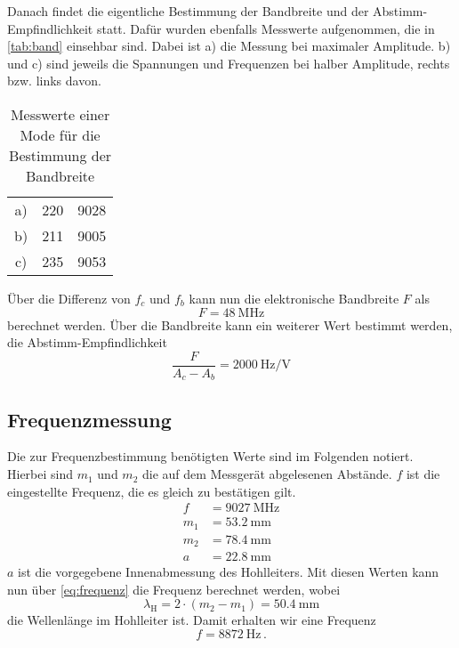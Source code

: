 Danach findet die eigentliche Bestimmung der Bandbreite und der Abstimm-Empfindlichkeit statt.
Dafür wurden ebenfalls Messwerte aufgenommen, die in \autoref{tab:band} einsehbar sind.
Dabei ist a) die Messung bei maximaler Amplitude.
b) und c) sind jeweils die Spannungen und Frequenzen bei halber Amplitude, rechts bzw. links davon.

\begin{table}
    \centering
    \caption{Messwerte einer Mode für die Bestimmung der Bandbreite}
    \label{tab:band}
    \begin{tabular}{c S[table-format=3.0] S[table-format=4.0]}
        \toprule
         &  &  \\
        \midrule
        a) & 220 & 9028 \\
        b) & 211 & 9005 \\
        c) & 235 & 9053 \\
        \bottomrule
    \end{tabular}
\end{table}

Über die Differenz von $f_c$ und $f_b$ kann nun die elektronische Bandbreite $F$ als 
\begin{equation*}
    F = \SI{48}{\mega\hertz}
\end{equation*}
berechnet werden.
Über die Bandbreite kann ein weiterer Wert bestimmt werden, die Abstimm-Empfindlichkeit
\begin{equation*}
    \frac{F}{A_c - A_b} = \SI{2000}{\hertz\per\volt}
\end{equation*}

\subsection{Frequenzmessung}
\label{ssec:a2}

Die zur Frequenzbestimmung benötigten Werte sind im Folgenden notiert.
Hierbei sind $m_1$ und $m_2$ die auf dem Messgerät abgelesenen Abstände.
$f$ ist die eingestellte Frequenz, die es gleich zu bestätigen gilt.
\begin{align*}
    f &= \SI{9027}{\mega\hertz} \\
    m_1 &= \SI{53.2}{\milli\meter} \\
    m_2 &= \SI{78.4}{\milli\meter} \\
    a &= \SI{22.8}{\milli\meter}
\end{align*}
$a$ ist die vorgegebene Innenabmessung des Hohlleiters.
Mit diesen Werten kann nun über \autoref{eq:frequenz} die Frequenz berechnet werden, wobei 
\begin{equation}
    \lambda _\text{H} = 2 \cdot (m_2 - m_1)= \SI{50.4}{\milli\meter}
    \label{eq:welle}
\end{equation}
die Wellenlänge im Hohlleiter ist.
Damit erhalten wir eine Frequenz
\begin{equation*}
    f = \SI{8872}{\hertz} \, .
\end{equation*}

